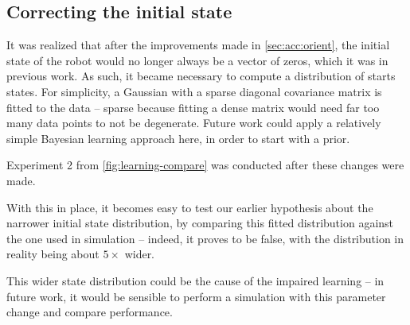 \documentclass[main.tex]{subfiles}
\begin{document}
\subsection{Correcting the initial state}

	It was realized that after the improvements made in \cref{sec:acc:orient}, the initial state of the robot would no longer always be a vector of zeros, which it was in previous work.
	As such, it became necessary to compute a distribution of starts states.
	For simplicity, a Gaussian with a sparse diagonal covariance matrix is fitted to the data -- sparse because fitting a dense matrix would need far too many data points to not be degenerate. Future work could apply a relatively simple Bayesian learning approach here, in order to start with a prior.

	Experiment 2 from \cref{fig:learning-compare} was conducted after these changes were made.

	With this in place, it becomes easy to test our earlier hypothesis about the narrower initial state distribution, by comparing this fitted distribution against the one used in simulation -- indeed, it proves to be false, with the distribution in reality being about $5\times$ wider\footnotemark.

	This wider state distribution could be the cause of the impaired learning -- in future work, it would be sensible to perform a simulation with this parameter change and compare performance.



\bib
\end{document}
